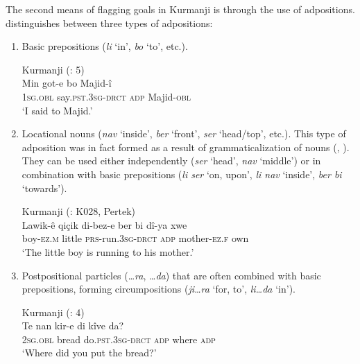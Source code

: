 \z

The second means of flagging goals in Kurmanji is through the use of adpositions. \citet{Haig2018} distinguishes between three types of adpositions:

\begin{enumerate}
    \item Basic prepositions (\textit{li} ‘in’, \textit{bo} ‘to’, etc.).

\ea%
  \label{ex:key:14} Kurmanji (\citealt{Haig2022}: 5)\\
\gll Min    got-e      bo  Majid-î\\
\textsc{1sg.obl}  say.\textsc{pst.3sg-drct}  \textsc{adp}  Majid-\textsc{obl}\\
\glt ‘I said to Majid.’ 
  \z

    \item Locational nouns (\textit{nav} ‘inside’, \textit{ber} ‘front’, \textit{ser} ‘head/top’, etc.). This type of adposition was in fact formed as a result of grammaticalization of nouns (\citealt{Haig2014}, \citealt{HaigThiele2014}). They can be used either independently (\textit{ser} ‘head’, \textit{nav} ‘middle’) or in combination with basic prepositions (\textit{li ser} ‘on, upon’, \textit{li nav} ‘inside’, \textit{ber bi} ‘towards’).

\ea%
  \label{ex:key:15} Kurmanji (\citealt{Matras2016}: K028, Pertek)\\
\gll Lawik-ê    qiçik  di-bez-e  ber bi    dî-ya    xwe \\
    boy-\textsc{ez.m}  little     \textsc{prs-}run.\textsc{3sg-drct}  \textsc{adp} {}   mother-\textsc{ez.f}  own\\
\glt ‘The little boy is running to his mother.’ 
  \z

    \item Postpositional particles (…\textit{ra}, …\textit{da}) that are often combined with basic prepositions, forming circumpositions (\textit{ji…ra} ‘for, to’, \textit{li…da} ‘in’).

\ea%
  \label{ex:key:16} Kurmanji (\citealt{Haig2022}: 4)\\
     \gll Te    nan  kir-e      di  kîve  da? \\
   \textsc{2sg.obl}  bread  do.\textsc{pst.3sg-drct}  \textsc{adp}  where    \textsc{adp}\\
\glt ‘Where did you put the bread?’
  \z

\end{enumerate}

